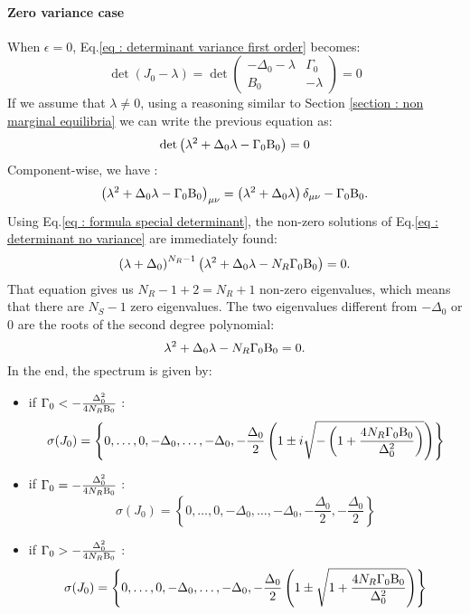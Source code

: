 \documentclass[12pt, titlepage]{report}
\begin{document}
	\paragraph{Zero variance case}\label{sec : methods dynamical stability fully connected zero variance}
	When $\epsilon=0$, Eq.\eqref{eq : determinant variance first order} becomes:
	\begin{equation}
	\det(J_0-\lambda)=\det\begin{pmatrix}
	-\Delta_0-\lambda & \Gamma_0 \\
	B_0 & -\lambda
	\end{pmatrix}
	=
	0
	\end{equation}
	If we assume that $\lambda\neq 0$, using a reasoning similar to Section \ref{section : non marginal equilibria} we can write the previous equation as:
	\begin{equation}
	\det\left(\lambda^2+\Delta_0 \lambda - \Gamma_0 \text{B}_0 \right)=0 \label{eq : determinant no variance}
	\end{equation}
	Component-wise, we have :
	\begin{equation}
	\left(\lambda^2+\Delta_0 \lambda - \Gamma_0 \text{B}_0 \right)_{\mu\nu} = \left(\lambda^2+\Delta_0 \lambda\right)\delta_{\mu \nu} - \Gamma_0\text{B}_0.
	\end{equation}
	Using Eq.\eqref{eq : formula special determinant}, the non-zero solutions of Eq.\eqref{eq : determinant no variance} are immediately found:
	\begin{equation}
	\left(\lambda+\Delta_0\right)^{N_R-1}\left(\lambda^2+\Delta_0 \lambda -N_R \Gamma_0 \text{B}_0\right)=0.
	\end{equation}
	That equation gives us $N_R-1+2=N_R+1$ non-zero eigenvalues, which means that there are $N_S-1$ zero eigenvalues. The two eigenvalues different from $-\Delta_0$ or $0$ are the roots of the second degree polynomial:
	\begin{equation}
	\lambda^2 + \Delta_0 \lambda- N_R \Gamma_0 \text{B}_0 =0.
	\end{equation}
	In the end, the spectrum is given by:
	\begin{itemize}
	\item if $\Gamma_0 < -\frac{\Delta_0^2}{4 N_R \text{B}_0}$ :
	\begin{equation}
	\sigma(J_0)= \left\{0, \dots, 0, -\Delta_0, \dots, -\Delta_0, -\frac{\Delta_0}{2} \left(1\pm i \sqrt{-\left(1+\frac{4N_R\Gamma_0\text{B}_0}{\Delta_0^2}\right)}\right)\right\}
	\end{equation}
	\item if $\Gamma_0 = -\frac{\Delta_0^2}{4 N_R \text{B}_0}$ :
	\begin{equation}
	\sigma(J_0)= \left\{0, \dots, 0, -\Delta_0, \dots, -\Delta_0, -\frac{\Delta_0}{2}, -\frac{\Delta_0}{2}\right\}
	\end{equation}
	\item if $\Gamma_0 > -\frac{\Delta_0^2}{4 N_R \text{B}_0}$ :
	\begin{equation}
	\sigma(J_0)= \left\{0, \dots, 0, -\Delta_0, \dots, -\Delta_0, -\frac{\Delta_0}{2} \left(1\pm \sqrt{1+\frac{4N_R\Gamma_0\text{B}_0}{\Delta_0^2}}\right)\right\}
	\end{equation}
	\end{itemize}
\end{document}
